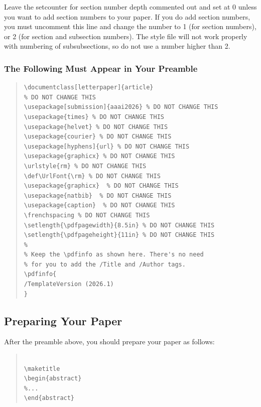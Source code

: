 Leave the setcounter for section number depth commented out and set at 0
unless you want to add section numbers to your paper. If you do add
section numbers, you must uncomment this line and change the number to 1
(for section numbers), or 2 (for section and subsection numbers). The
style file will not work properly with numbering of subsubsections, so
do not use a number higher than 2.

\subsubsection{The Following Must Appear in Your Preamble}
\begin{quote}
\begin{scriptsize}\begin{verbatim}
\documentclass[letterpaper]{article}
% DO NOT CHANGE THIS
\usepackage[submission]{aaai2026} % DO NOT CHANGE THIS
\usepackage{times} % DO NOT CHANGE THIS
\usepackage{helvet} % DO NOT CHANGE THIS
\usepackage{courier} % DO NOT CHANGE THIS
\usepackage[hyphens]{url} % DO NOT CHANGE THIS
\usepackage{graphicx} % DO NOT CHANGE THIS
\urlstyle{rm} % DO NOT CHANGE THIS
\def\UrlFont{\rm} % DO NOT CHANGE THIS
\usepackage{graphicx}  % DO NOT CHANGE THIS
\usepackage{natbib}  % DO NOT CHANGE THIS
\usepackage{caption}  % DO NOT CHANGE THIS
\frenchspacing % DO NOT CHANGE THIS
\setlength{\pdfpagewidth}{8.5in} % DO NOT CHANGE THIS
\setlength{\pdfpageheight}{11in} % DO NOT CHANGE THIS
%
% Keep the \pdfinfo as shown here. There's no need
% for you to add the /Title and /Author tags.
\pdfinfo{
/TemplateVersion (2026.1)
}
\end{verbatim}\end{scriptsize}
\end{quote}

\subsection{Preparing Your Paper}

After the preamble above, you should prepare your paper as follows:

\begin{quote}
\begin{scriptsize}\begin{verbatim}

\maketitle
\begin{abstract}
%...
\end{abstract}\end{verbatim}\end{scriptsize}
\end{quote}

